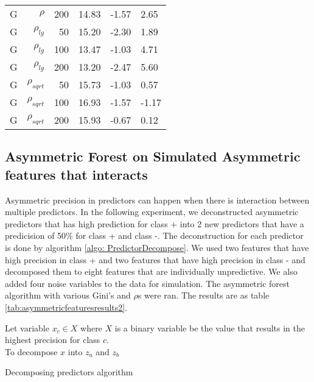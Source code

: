 \begin{table}
\begin{tabular}{rrrp{2.5cm}p{2.5cm}p{2.5cm}}
G     & $\rho$ & 200   & 14.83 & -1.57 & 2.65 \\
G     & $\rho_{lg}$ & 50    & 15.20 & -2.30 & 1.89 \\
G     & $\rho_{lg}$ & 100   & 13.47 & -1.03 & 4.71 \\
G     & $\rho_{lg}$ & 200   & 13.20 & -2.47 & 5.60 \\
G     & $\rho_{sqrt}$ & 50    & 15.73 & -1.03 & 0.57 \\
G     & $\rho_{sqrt}$ & 100   & 16.93 & -1.57 & -1.17 \\
G     & $\rho_{sqrt}$ & 200   & 15.93 & -0.67 & 0.12 \bigstrut[b]\\
\hline
\end{tabular}%
\label{tab:asymmetricfeaturesresults}%
\end{table}%


\subsection{Asymmetric Forest on Simulated Asymmetric features that interacts}
Asymmetric precision in predictors can happen when there is interaction between multiple predictors. In the following experiment, we deconstructed asymmetric predictors that has high prediction for class + into 2 new predictors that have a predicision of 50\% for class + and class -. The deconstruction for each predictor is done by algorithm \ref{algo: PredictorDecompose}. We used two features that have high precision in class + and two features that have high precision in class - and decomposed them to eight features that are individually unpredictive. We also added four noise variables to the data for simulation. The asymmetric forest algorithm with various Gini's and $\rho$s were ran. The results are as table \ref{tab:asymmetricfeaturesresults2}. 
\begin{algorithm}
Let variable $x_c\in X$ where $X$ is a binary variable be the value that results in the highest precision for class $c$.\\
To decompose $x$ into $z_a$ and $z_b$

\caption{Decomposing predictors algorithm}\label{algo: PredictorDecompose}
\end{algorithm}


